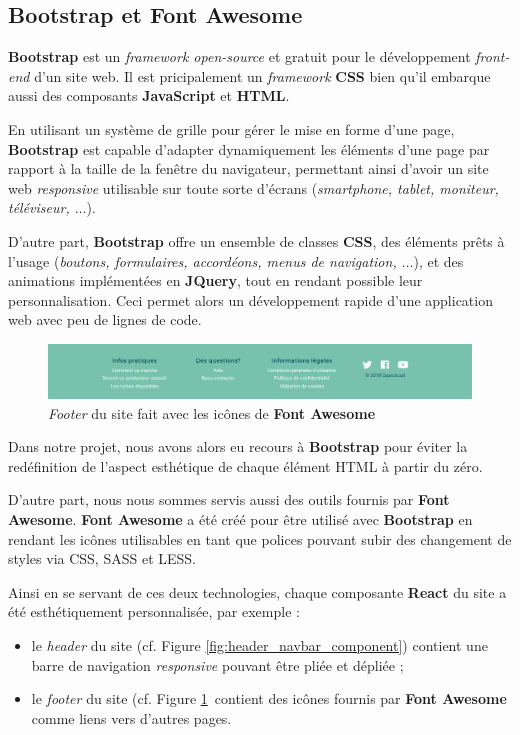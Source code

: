 \documentclass[a4paper,12pt]{report}
\theoremstyle{break}
\theoremstyle{break}
\theoremstyle{break}
\theoremstyle{break}
\theoremstyle{definition}
\theoremstyle{remark}
\begin{document}
\subsection{Bootstrap et Font Awesome}
\textbf{Bootstrap} est un \textit{framework open-source} et gratuit pour le développement \textit{front-end} d'un site web. Il est pricipalement un \textit{framework} \textbf{CSS} bien qu'il embarque aussi des composants \textbf{JavaScript} et \textbf{HTML}.

En utilisant un système de grille pour gérer le mise en forme d'une page, \textbf{Bootstrap} est capable d'adapter dynamiquement les éléments d'une page par rapport à la taille de la fenêtre du navigateur, permettant ainsi d'avoir un site web \textit{responsive} utilisable sur toute sorte d'écrans (\textit{smartphone, tablet, moniteur, téléviseur, $\dots$}).

D'autre part, \textbf{Bootstrap} offre un ensemble de classes \textbf{CSS}, des éléments prêts à l'usage (\textit{boutons, formulaires, accordéons, menus de navigation, $\dots$}), et des animations implémentées en \textbf{JQuery}, tout en rendant possible leur personnalisation. Ceci permet alors un développement rapide d'une application web avec peu de lignes de code.

\begin{figure}[!ht]
  \centering
  \includegraphics[scale=0.35]{images/footer.png}
  \caption{\textit{Footer} du site fait avec les icônes de \textbf{Font Awesome}}
  \label{fig:footer_font_awesome}
\end{figure}

Dans notre projet, nous avons alors eu recours à \textbf{Bootstrap} pour éviter la redéfinition de l'aspect esthétique de chaque élément HTML à partir du zéro.

D'autre part, nous nous sommes servis aussi des outils fournis par \textbf{Font Awesome}. \textbf{Font Awesome} a été créé pour être utilisé avec \textbf{Bootstrap} en rendant les icônes utilisables en tant que polices pouvant subir des changement de styles via CSS, SASS et LESS.

Ainsi en se servant de ces deux technologies, chaque composante \textbf{React} du site a été esthétiquement personnalisée, par exemple :
\begin{itemize}
  \item le \textit{header} du site (cf. Figure \ref{fig:header_navbar_component}) contient une barre de navigation \textit{responsive} pouvant être pliée et dépliée ;
  \item le \textit{footer} du site (cf. Figure \ref{fig:footer_font_awesome} contient des icônes fournis par \textbf{Font Awesome} comme liens vers d'autres pages.
\end{itemize}
\end{document}
